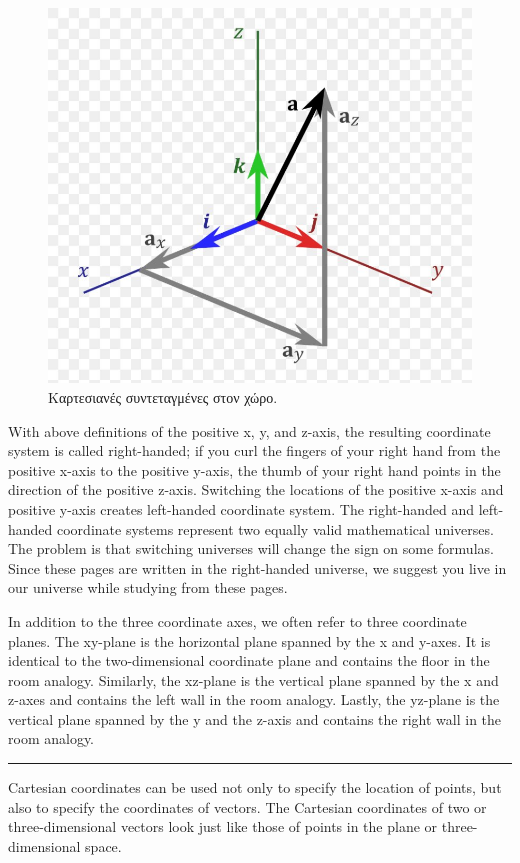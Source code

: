 \begin{figure}[h]
    \centering
    \includegraphics[scale=0.3]{Figures/appendixA_cartesian3D.jpg}
    \caption{Καρτεσιανές συντεταγμένες στον χώρο.}
    \label{fig:apxA_cartesian3D}
\end{figure}

With above definitions of the positive x, y, and z-axis, the resulting coordinate system is called right-handed; if you curl the fingers of your right hand from the positive x-axis to the positive y-axis, the thumb of your right hand points in the direction of the positive z-axis. Switching the locations of the positive x-axis and positive y-axis creates left-handed coordinate system. The right-handed and left-handed coordinate systems represent two equally valid mathematical universes. The problem is that switching universes will change the sign on some formulas. Since these pages are written in the right-handed universe, we suggest you live in our universe while studying from these pages.

In addition to the three coordinate axes, we often refer to three coordinate planes. The xy-plane is the horizontal plane spanned by the x and y-axes. It is identical to the two-dimensional coordinate plane and contains the floor in the room analogy. Similarly, the xz-plane is the vertical plane spanned by the x and z-axes and contains the left wall in the room analogy. Lastly, the yz-plane is the vertical plane spanned by the y and the z-axis and contains the right wall in the room analogy.
\\
{\color{red} \hrule}
Cartesian coordinates can be used not only to specify the location of points, but also to specify the coordinates of vectors. The Cartesian coordinates of two or three-dimensional vectors look just like those of points in the plane or three-dimensional space.

